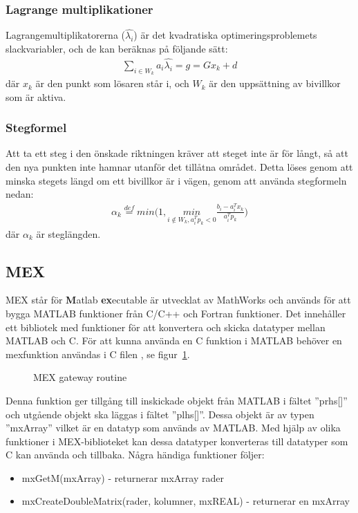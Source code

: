 \subsubsection{Lagrange multiplikationer}
Lagrangemultiplikatorerna ($\hat{\lambda_i}$) är det kvadratiska optimeringsproblemets slackvariabler, och de kan beräknas på följande sätt: \\ 
\begin{equation*}
\begin{aligned}
\sum_{i \in W_k} a_i \hat{\lambda_i} = g = G x_k + d
\end{aligned}
\end{equation*}
där $x_k$ är den punkt som lösaren står i, och $W_k$ är den uppsättning av bivillkor som är aktiva.


\subsubsection{Stegformel}
Att ta ett steg i den önskade riktningen kräver att steget inte är för långt, så att den nya punkten inte hamnar utanför det tillåtna området. Detta löses genom att minska stegets längd om ett bivillkor är i vägen, genom att använda stegformeln nedan:
\begin{equation*}
\begin{aligned}
\alpha_k\overset{def}{=}min \bigg(1,\underset{i\notin W_k,a_i^Tp_k<0}{min} \frac{b_i-a_i^Tx_k}{a_i^Tp_k} \bigg)
\end{aligned}
\end{equation*}
där $\alpha_k$ är steglängden. 

\subsection{MEX}
\label{sec:mex}
MEX står för \textbf{M}atlab \textbf{ex}ecutable är utvecklat av MathWorks och används för att bygga MATLAB funktioner från C/C++ och Fortran funktioner. Det innehåller ett bibliotek med funktioner för att konvertera och skicka datatyper mellan MATLAB och C. För att kunna använda en C funktion i MATLAB behöver en mexfunktion användas i C filen \citep{mathworks}, se figur~\ref{fig:mex}. 

\begin{figure}[H]

\caption{MEX gateway routine}
\label{fig:mex}
\end{figure}  

Denna funktion ger tillgång till inskickade objekt från MATLAB i fältet ''prhs[]'' och utgående objekt ska läggas i fältet ''plhs[]''. Dessa objekt är av typen ''mxArray'' vilket är en datatyp som används av MATLAB. Med hjälp av olika funktioner i MEX-biblioteket kan dessa datatyper konverteras till datatyper som C kan använda och tillbaka\citep{mathworks}. Några händiga funktioner följer:
\begin{itemize}
\item mxGetM(mxArray) - returnerar mxArray rader
\item mxCreateDoubleMatrix(rader, kolumner, mxREAL) - returnerar en mxArray
\end{itemize}

